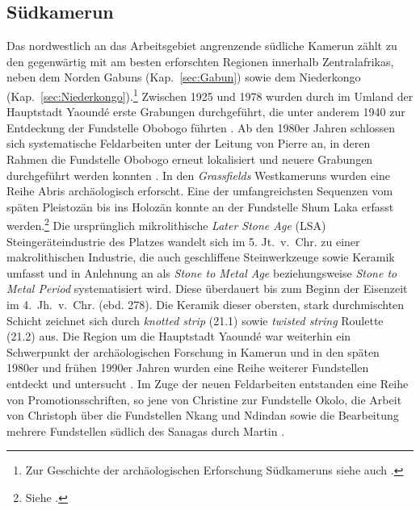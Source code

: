 \subsection{Südkamerun}\label{sec:Kamerun}

Das nordwestlich an das Arbeitsgebiet angrenzende südliche Kamerun zählt zu den gegenwärtig mit am besten erforschten Regionen innerhalb Zentralafrikas, neben dem Norden Gabuns (Kap.~\ref{sec:Gabun}) sowie dem Niederkongo (Kap.~\ref{sec:Niederkongo}).\footnote{Zur Geschichte der archäologischen Erforschung Südkameruns siehe auch \textcite[7--9]{Seidensticker.2010b}.} Zwischen 1925 und 1978 wurden durch \textcites{Jauze.1944}{Jauze.1944b}{Jauze.1948} im Umland der Hauptstadt Yaoundé erste Grabungen durchgeführt, die unter anderem 1940 zur Entdeckung der Fundstelle Obobogo führten \parencite[nach][458]{Clist.1990}. Ab den 1980er Jahren schlossen sich systematische Feldarbeiten unter der Leitung von Pierre \textcites{Maret.1980}{Maret.1982} an, in deren Rahmen die Fundstelle Obobogo erneut lokalisiert und neuere Grabungen durchgeführt werden konnten \parencite{Claes.1985}. In den \textit{Grassfields} Westkameruns wurden eine Reihe Abris archäologisch erforscht. Eine der umfangreichsten Sequenzen vom späten Pleistozän bis ins Holozän konnte an der Fundstelle Shum Laka erfasst werden.\footnote{Siehe \textcites{Asombang.1988}{Asombang.1992}{Cornelissen.1996}{Cornelissen.2003}{deMaret.1995}{Maret.1996}{Lavachery.1996}{Moeyersons.1996}.} Die ursprünglich mikrolithische \textit{Later Stone Age} (LSA) Steingeräteindustrie des Platzes wandelt sich im 5. Jt.~v.~Chr. zu einer makrolithischen Industrie, die auch geschliffene Steinwerkzeuge sowie Keramik umfasst und in Anlehnung an \textcite{McIntosh.1988} als \textit{Stone to Metal Age} \parencite[SMA;][213]{Lavachery.2001} beziehungsweise \textit{Stone to Metal Period} \parencite[SMP;][279]{Maret.1996} systematisiert wird. Diese überdauert bis zum Beginn der Eisenzeit im 4.~Jh.~v.~Chr. (ebd. 278). Die Keramik dieser obersten, stark durchmischten Schicht zeichnet sich durch \textit{knotted strip} (21.1) sowie \textit{twisted string} Roulette (21.2) aus. Die Region um die Hauptstadt Yaoundé war weiterhin ein Schwerpunkt der archäologischen Forschung in Kamerun und in den späten 1980er und frühen 1990er Jahren wurden eine Reihe weiterer Fundstellen entdeckt und untersucht \parencite{Essomba.1989}. Im Zuge der neuen Feldarbeiten entstanden eine Reihe von Promotionsschriften, so jene von Christine \textcite{Atangana.1988} zur Fundstelle Okolo, die Arbeit von Christoph \textcite{MbidaMindzie.19951996} über die Fundstellen Nkang und Ndindan sowie die Bearbeitung mehrere Fundstellen südlich des Sanagas durch Martin \textcite{Elouga.20002001}.


